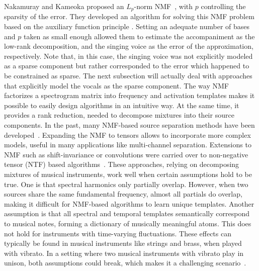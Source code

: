 Nakamuray and Kameoka proposed an $L_p$-norm NMF~\cite{nakamuray15}, with $p$ controlling the sparsity of the error. They developed an algorithm for solving this NMF problem based on the auxiliary function principle \cite{ortega70,kameoka06}. Setting an adequate number of bases and $p$ taken as small enough allowed them to estimate the accompaniment as the low-rank decomposition, and the singing voice as the error of the approximation, respectively. Note that, in this case, the singing voice was not explicitly modeled as a sparse component but rather corresponded to the error which happened to be constrained as sparse. The next subsection will actually deal with approaches that explicitly model the vocals as the sparse component.
The way NMF factorizes a spectrogram matrix into frequency and activation templates makes it possible to easily design algorithms in an intuitive way. At the same time, it provides a rank reduction, needed to decompose mixtures into their source components.
In the past, many NMF-based source separation methods have been developed~\cite{smaragdis03, smaragdis04, virtanen07}. Expanding the NMF to tensors allows to incorporate more complex models, useful in many applications like multi-channel separation. Extensions to NMF such as shift-invariance or convolutions were carried over to non-negative tensor (NTF) based algorithms~\cite{fitzgerald05, fitzgerald08, fitzgerald06, fevotte10, ozerov11}. These approaches, relying on decomposing mixtures of musical instruments, work well when certain assumptions hold to be true.
One is that spectral harmonics only partially overlap. However, when two sources share the same fundamental frequency, almost all partials do overlap, making it difficult for NMF-based algorithms to learn unique templates. Another assumption is that all spectral and temporal templates semantically correspond to musical notes, forming a dictionary of musically meaningful atoms.
This does not hold for instruments with time-varying fluctuations. These effects can typically be found in musical instruments like strings and brass, when played with vibrato. In a setting where two musical instruments with vibrato play in unison, both assumptions could break, which makes it a challenging scenario~\cite{stoeter14}.

